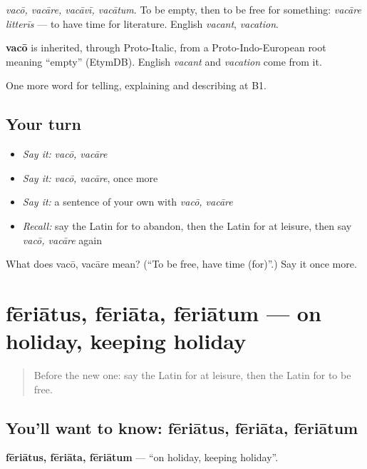 \emph{vacō, vacāre, vacāvī, vacātum}. To be empty, then to be free for something: \emph{vacāre litterīs} — to have time for literature. English \emph{vacant}, \emph{vacation}.

\begin{cousinweb}
\textbf{vacō} is inherited, through Proto-Italic, from a Proto-Indo-European root meaning \textquotedblleft{}empty\textquotedblright{} (EtymDB). English \emph{vacant} and \emph{vacation} come from it.
\end{cousinweb}

\begin{grammarlens}[title={What you've built}]
One more word for telling, explaining and describing at B1.
\end{grammarlens}

\subsection*{Your turn}
\begin{itemize}
\raggedright
  \item \emph{Say it:} \emph{vacō, vacāre}
  \item \emph{Say it:} \emph{vacō, vacāre}, once more
  \item \emph{Say it:} a sentence of your own with \emph{vacō, vacāre}
  \item \emph{Recall:} say the Latin for to abandon, then the Latin for at leisure, then say \emph{vacō, vacāre} again
\end{itemize}

\begin{tcolorbox}[breakable,colback=teal!4,colframe=teal!35!black,title={Before you move on}]
What does vacō, vacāre mean? (\textquotedblleft{}To be free, have time (for)\textquotedblright{}.) Say it once more.
\end{tcolorbox}
\section[fēriātus, fēriāta, fēriātum]{fēriātus, fēriāta, fēriātum — on holiday, keeping holiday}

\label{lesson:LA-C538-feriatus}



\begin{quote}
Before the new one: say the Latin for at leisure, then the Latin for to be free.
\end{quote}

\subsection*{You'll want to know: fēriātus, fēriāta, fēriātum}
\textbf{fēriātus, fēriāta, fēriātum} — \textquotedblleft{}on holiday, keeping holiday\textquotedblright{}.

